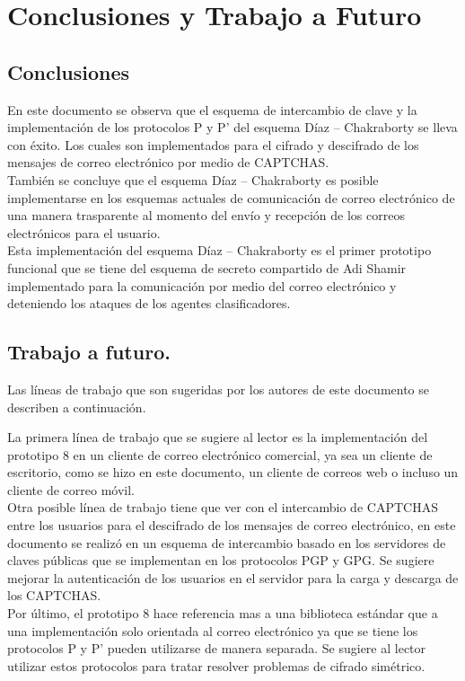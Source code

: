 \chapter{Conclusiones y Trabajo a Futuro}
\section{Conclusiones}

En este documento se observa que el esquema de intercambio de clave y la implementación de los protocolos P y P’ del esquema Díaz – Chakraborty se lleva con éxito. Los cuales son implementados para el cifrado y descifrado de los mensajes de correo electrónico por medio de CAPTCHAS. \\

También se concluye que el esquema Díaz – Chakraborty es posible implementarse en los esquemas actuales de comunicación de correo electrónico de una manera trasparente al momento del envío y recepción de los correos electrónicos para el usuario.\\

Esta implementación del esquema Díaz – Chakraborty es el primer prototipo funcional que se tiene del esquema de secreto compartido de Adi Shamir implementado para la comunicación por medio del correo electrónico y deteniendo los ataques de los agentes clasificadores.

\section{Trabajo a futuro.}

Las líneas de trabajo que son sugeridas por los autores de este documento se describen a continuación.

La primera línea de trabajo que se sugiere al lector es la implementación del prototipo 8 en un cliente de correo electrónico comercial, ya sea un cliente de escritorio, como se hizo en este documento, un cliente de correos web o incluso un cliente de correo móvil.\\

Otra posible línea de trabajo tiene que ver con el intercambio de CAPTCHAS entre los usuarios para el descifrado de los mensajes de correo electrónico, en este documento se realizó en un esquema de intercambio basado en los servidores de claves públicas que se implementan en los protocolos PGP y GPG. Se sugiere mejorar la autenticación  de los usuarios en el servidor para la carga y descarga de los CAPTCHAS.\\

Por último, el prototipo 8 hace referencia mas a una biblioteca estándar que a una implementación solo orientada al correo electrónico ya que se tiene los protocolos P y P’ pueden utilizarse de manera separada. Se sugiere al lector utilizar estos protocolos para tratar resolver problemas de cifrado simétrico.